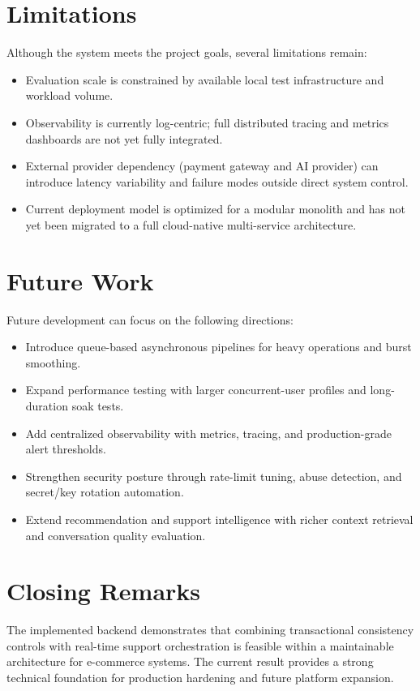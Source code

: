 \section{Limitations}

Although the system meets the project goals, several limitations remain:
\begin{itemize}
    \item Evaluation scale is constrained by available local test infrastructure and workload volume.
    \item Observability is currently log-centric; full distributed tracing and metrics dashboards are not yet fully integrated.
    \item External provider dependency (payment gateway and AI provider) can introduce latency variability and failure modes outside direct system control.
    \item Current deployment model is optimized for a modular monolith and has not yet been migrated to a full cloud-native multi-service architecture.
\end{itemize}

\section{Future Work}

Future development can focus on the following directions:
\begin{itemize}
    \item Introduce queue-based asynchronous pipelines for heavy operations and burst smoothing.
    \item Expand performance testing with larger concurrent-user profiles and long-duration soak tests.
    \item Add centralized observability with metrics, tracing, and production-grade alert thresholds.
    \item Strengthen security posture through rate-limit tuning, abuse detection, and secret/key rotation automation.
    \item Extend recommendation and support intelligence with richer context retrieval and conversation quality evaluation.
\end{itemize}

\section{Closing Remarks}

The implemented backend demonstrates that combining transactional consistency controls with real-time support orchestration is feasible within a maintainable architecture for e-commerce systems. The current result provides a strong technical foundation for production hardening and future platform expansion.
